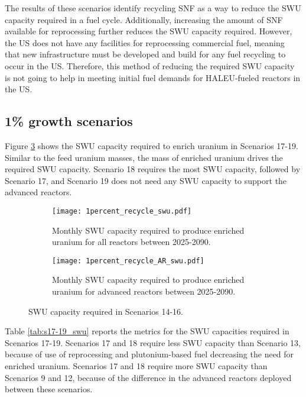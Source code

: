 The results of these scenarios identify recycling \gls{SNF} as a way 
to reduce the \gls{SWU} capacity required in a fuel cycle. Additionally, 
increasing the amount of \gls{SNF} available for reprocessing further 
reduces the \gls{SWU} capacity required. However, the US does not have 
any facilities for reprocessing commercial fuel, meaning that new 
infrastructure must be developed and build for any fuel recycling to 
occur in the US. Therefore, this method of reducing the 
required \gls{SWU} capacity is not going to help in meeting initial 
fuel demands for \gls{HALEU}-fueled reactors in the US. 

\subsection{1\% growth scenarios}
Figure \ref{fig:1percent_recycle_swu} shows the \gls{SWU} capacity 
required to enrich uranium in Scenarios 17-19. Similar to the 
feed uranium masses, the mass of enriched uranium drives 
the required \gls{SWU} capacity. Scenario 18 requires the most 
\gls{SWU} capacity, followed by Scenario 17, and Scenario 19 does 
not need any \gls{SWU} capacity to support the advanced reactors. 

\begin{figure}[h!]
    \centering
    \begin{subfigure}[b]{0.45\textwidth}
        \centering
        \texttt{[image: 1percent\_recycle\_swu.pdf]}
        \caption{Monthly SWU capacity required to produce 
        enriched uranium for all reactors between 2025-2090.}
        \label{fig:1percent_recycle_swu_all}
    \end{subfigure}
    \hfill
    \begin{subfigure}[b]{0.45\textwidth}
        \centering
        \texttt{[image: 1percent\_recycle\_AR\_swu.pdf]}
        \caption{Monthly SWU capacity required to produce 
        enriched uranium for advanced reactors between 2025-2090.}
        \label{fig:1percent_recycle_swu_AR}
    \end{subfigure}
       \caption{\gls{SWU} capacity required in Scenarios 14-16.}
       \label{fig:1percent_recycle_swu}
\end{figure}

Table \ref{tab:s17-19_swu} reports the metrics for the \gls{SWU} capacities 
required in Scenarios 17-19. Scenarios 17 and 18 require less 
\gls{SWU} capacity than Scenario 13, because of use of 
reprocessing and plutonium-based fuel decreasing the need for 
enriched uranium. Scenarios 17 and 18 require more \gls{SWU} 
capacity than Scenarios 9 and 12, because of the difference in 
the advanced reactors deployed between these scenarios. 

